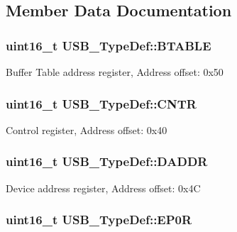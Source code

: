 \subsection{Member Data Documentation}
\hypertarget{struct_u_s_b___type_def_a595086949677f98d2cc1900af3f08c1c}{
\subsubsection[{B\-T\-A\-B\-L\-E}]{ uint16\-\_\-t U\-S\-B\-\_\-\-Type\-Def\-::\-B\-T\-A\-B\-L\-E}}\label{struct_u_s_b___type_def_a595086949677f98d2cc1900af3f08c1c}
Buffer Table address register, Address offset\-: 0x50 \hypertarget{struct_u_s_b___type_def_a4498c5c5730133fd8f3d032333df1622}{
\subsubsection[{C\-N\-T\-R}]{ uint16\-\_\-t U\-S\-B\-\_\-\-Type\-Def\-::\-C\-N\-T\-R}}\label{struct_u_s_b___type_def_a4498c5c5730133fd8f3d032333df1622}
Control register, Address offset\-: 0x40 \hypertarget{struct_u_s_b___type_def_a3a8069bbd10ce243a750f5e18346ce2e}{
\subsubsection[{D\-A\-D\-D\-R}]{ uint16\-\_\-t U\-S\-B\-\_\-\-Type\-Def\-::\-D\-A\-D\-D\-R}}\label{struct_u_s_b___type_def_a3a8069bbd10ce243a750f5e18346ce2e}
Device address register, Address offset\-: 0x4\-C \hypertarget{struct_u_s_b___type_def_ac9558c2899f9540e56c8cfbca2fb3ff1}{
\subsubsection[{E\-P0\-R}]{ uint16\-\_\-t U\-S\-B\-\_\-\-Type\-Def\-::\-E\-P0\-R}}\label{struct_u_s_b___type_def_ac9558c2899f9540e56c8cfbca2fb3ff1}
